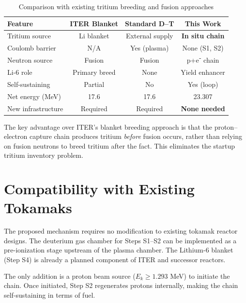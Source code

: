 \documentclass[12pt,a4paper]{article}
\begin{document}
\begin{table}[h!]
\centering
\caption{Comparison with existing tritium breeding and fusion approaches}
\vspace{0.5em}
\begin{tabular}{lccc}
\toprule
\textbf{Feature} & \textbf{ITER Blanket} & \textbf{Standard D--T} & \textbf{This Work} \\
\midrule
Tritium source       & Li blanket     & External supply  & \textbf{In situ chain} \\
Coulomb barrier      & N/A            & Yes (plasma)     & None (S1, S2)    \\
Neutron source       & Fusion         & Fusion           & p+e⁻ chain       \\
Li-6 role            & Primary breed  & None             & Yield enhancer   \\
Self-sustaining      & Partial        & No               & Yes (loop)       \\
Net energy (MeV)     & 17.6           & 17.6             & 23.307           \\
New infrastructure   & Required       & Required         & \textbf{None needed} \\
\bottomrule
\end{tabular}
\end{table}

The key advantage over ITER's blanket breeding approach is that
the proton--electron capture chain produces tritium \emph{before}
fusion occurs, rather than relying on fusion neutrons to breed
tritium after the fact. This eliminates the startup tritium
inventory problem.

\section{Compatibility with Existing Tokamaks}

The proposed mechanism requires no modification to existing tokamak
reactor designs. The deuterium gas chamber for Steps S1--S2 can be
implemented as a pre-ionization stage upstream of the plasma chamber.
The Lithium-6 blanket (Step S4) is already a planned component of
ITER and successor reactors.

The only addition is a proton beam source ($E_k \geq 1.293$ MeV)
to initiate the chain. Once initiated, Step S2 regenerates protons
internally, making the chain self-sustaining in terms of fuel.
\end{document}
